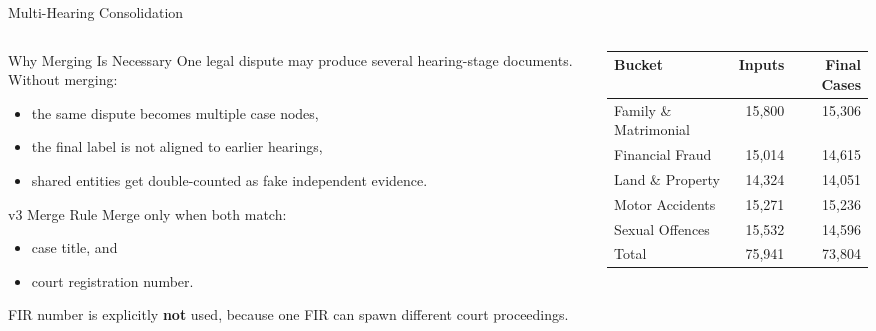 \documentclass[aspectratio=169,11pt]{beamer}
\newenvironment{tightitemize}{
  \begin{itemize}
    \setlength{\itemsep}{2pt}
    \setlength{\parskip}{0pt}
}{\end{itemize}}
\newcommand{\highlight}[1]{\textcolor{ThesisBlue}{\textbf{#1}}}
\begin{document}
\begin{frame}{Multi-Hearing Consolidation}
  \scriptsize
  \begin{columns}[T]
    \begin{column}{0.46\textwidth}
      \begin{block}{Why Merging Is Necessary}
        One legal dispute may produce several hearing-stage documents. Without merging:
        \begin{tightitemize}
          \item the same dispute becomes multiple case nodes,
          \item the final label is not aligned to earlier hearings,
          \item shared entities get double-counted as fake independent evidence.
        \end{tightitemize}
      \end{block}
      \begin{block}{v3 Merge Rule}
        Merge only when both match:
        \begin{tightitemize}
          \item case title, and
          \item court registration number.
        \end{tightitemize}
        FIR number is explicitly \highlight{not} used, because one FIR can spawn different court proceedings.
      \end{block}
    \end{column}
    \begin{column}{0.50\textwidth}
      \scriptsize
      \begin{tabular}{lrr}
        \toprule
        Bucket & Inputs & Final Cases \\
        \midrule
        Family \& Matrimonial & 15{,}800 & 15{,}306 \\
        Financial Fraud & 15{,}014 & 14{,}615 \\
        Land \& Property & 14{,}324 & 14{,}051 \\
        Motor Accidents & 15{,}271 & 15{,}236 \\
        Sexual Offences & 15{,}532 & 14{,}596 \\
        \midrule
        Total & 75{,}941 & 73{,}804 \\
        \bottomrule
      \end{tabular}


\end{column}
\end{columns}
\end{frame}
\end{document}
